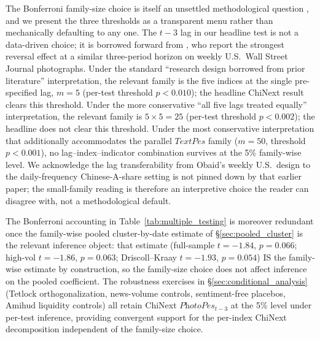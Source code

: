 \documentclass[AER]{AEA}
\begin{document}
The Bonferroni family-size choice is itself an unsettled methodological question \citep{harvey2016cross}, and we present the three thresholds as a transparent menu rather than mechanically defaulting to any one. The $t-3$ lag in our headline test is not a data-driven choice; it is borrowed forward from \citet{obaid2022picture}, who report the strongest reversal effect at a similar three-period horizon on weekly U.S.\ Wall Street Journal photographs. Under the standard ``research design borrowed from prior literature'' interpretation, the relevant family is the five indices at the single pre-specified lag, $m=5$ (per-test threshold $p<0.010$); the headline ChiNext result clears this threshold. Under the more conservative ``all five lags treated equally'' interpretation, the relevant family is $5 \times 5 = 25$ (per-test threshold $p<0.002$); the headline does not clear this threshold. Under the most conservative interpretation that additionally accommodates the parallel $\textit{TextPes}$ family ($m=50$, threshold $p<0.001$), no lag--index--indicator combination survives at the 5\% family-wise level. We acknowledge the lag transferability from Obaid's weekly U.S.\ design to the daily-frequency Chinese-A-share setting is not pinned down by that earlier paper; the small-family reading is therefore an interpretive choice the reader can disagree with, not a methodological default.

The Bonferroni accounting in Table~\ref{tab:multiple_testing} is moreover redundant once the family-wise pooled cluster-by-date estimate of \S\ref{sec:pooled_cluster} is the relevant inference object: that estimate (full-sample $t=-1.84$, $p=0.066$; high-vol $t=-1.86$, $p=0.063$; Driscoll--Kraay $t=-1.93$, $p=0.054$) IS the family-wise estimate by construction, so the family-size choice does not affect inference on the pooled coefficient. The robustness exercises in \S\ref{sec:conditional_analysis} (Tetlock orthogonalization, news-volume controls, sentiment-free placebos, Amihud liquidity controls) all retain ChiNext $\textit{PhotoPes}_{t-3}$ at the 5\% level under per-test inference, providing convergent support for the per-index ChiNext decomposition independent of the family-size choice.
\end{document}
